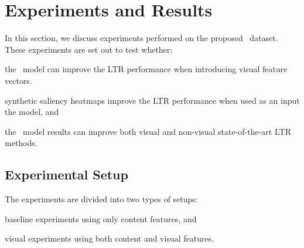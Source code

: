 
%



\section{Experiments and Results}
In this section, we discuss experiments performed on the proposed \datasetname~dataset.
These experiments are set out to test whether:
\begin{inparaenum}[(i)]
\item the \modelname~model can improve the \ac{LTR} performance when introducing visual feature vectors. 
\item synthetic saliency heatmaps improve the \ac{LTR} performance when used as an input the \modelname{} model, and
\item the \modelname~model results can improve both visual and non-visual state-of-the-art \ac{LTR} methods.
\end{inparaenum}

\subsection{Experimental Setup}
The experiments are divided into two types of setups:
\begin{inparaenum}[(i)]
\item baseline experiments using only content features, and
\item visual experiments using both content and visual features.
\end{inparaenum}

